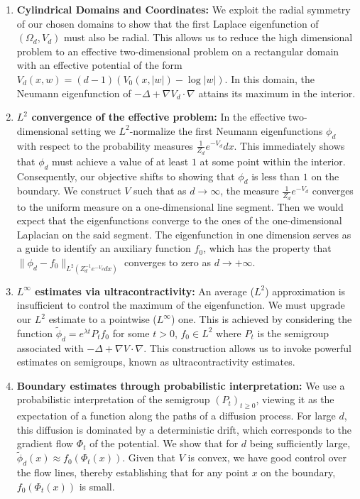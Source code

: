 \begin{enumerate}
    \item \textbf{Cylindrical Domains and Coordinates:} We exploit the radial symmetry of our chosen domains to show that the first Laplace eigenfunction of $(\Omega_d, V_d)$ must also be radial. This allows us to reduce the high dimensional problem to an effective two-dimensional problem on a rectangular domain with an effective potential of the form \( V_d(x,w)=(d-1)(V_0(x,|w|)-\log |w|) \). In this domain, the Neumann eigenfunction of \( -\Delta + \nabla V_d \cdot \nabla \) attains its maximum in the interior.

    \item \textbf{$L^2$ convergence of the effective problem:} In the effective two-dimensional setting we $L^2$-normalize the first Neumann eigenfunctions $\phi_d$ with respect to the probability measures $\frac{1}{Z_d}e^{-V_d} dx$. This immediately shows that $\phi_d$ must achieve a value of at least $1$ at some point within the interior. Consequently, our objective shifts to showing that $\phi_d$ is less than $1$ on the boundary. We construct $V$ such that as $d \to \infty$, the measure $\frac{1}{Z_d}e^{-V_d}$ converges to the uniform measure on a one-dimensional line segment. Then we would expect that the eigenfunctions converge to the ones of the one-dimensional Laplacian on the said segment. The eigenfunction in one dimension serves as a guide to identify an auxiliary function $f_0$, which has the property that $\|\phi_d-f_0\|_{L^2(Z_d^{-1}e^{-V_d}dx)}$ converges to zero as $d \to +\infty$. 

    \item \textbf{$L^\infty$ estimates via ultracontractivity:} An average ($L^2$) approximation is insufficient to control the maximum of the eigenfunction. We must upgrade our $L^2$ estimate to a pointwise ($L^\infty$) one. This is achieved by considering the function $\tilde \phi_d = e^{\lambda t} P_t f_0$ for some $t>0$, $f_0 \in L^2$ where $P_t$ is the semigroup associated with $-\Delta + \nabla V \cdot \nabla$. This construction allows us to invoke powerful estimates on semigroups, known as ultracontractivity estimates.
    
    \item \textbf{Boundary estimates through probabilistic interpretation:} We use a probabilistic interpretation of the semigroup $(P_t)_{t \ge 0}$, viewing it as the expectation of a function along the paths of a diffusion process. For large $d$, this diffusion is dominated by a deterministic drift, which corresponds to the gradient flow $\Phi_t$ of the potential. We show that for $d$ being sufficiently large, $\tilde \phi_d(x) \approx f_0(\Phi_t(x))$. Given that $V$ is convex, we have good control over the flow lines, thereby establishing that for any point $x$ on the boundary, $f_0(\Phi_t(x))$ is small.


\end{enumerate}
